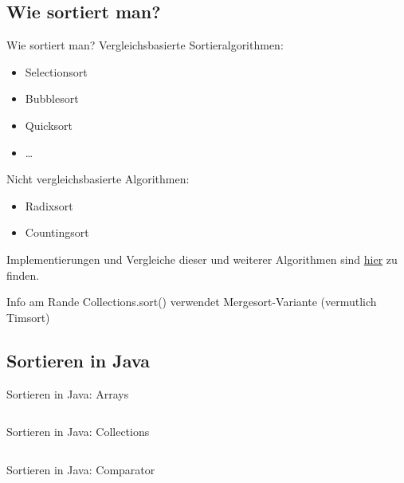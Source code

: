 \documentclass[usepdftitle=false,hyperref={pdfpagelabels=false}]{beamer}
\begin{document}
\subsection{Wie sortiert man?}
\begin{frame}{Wie sortiert man?}
    Vergleichsbasierte Sortieralgorithmen:
    \begin{itemize}
        \item Selectionsort
        \item Bubblesort
        \item Quicksort
        \item \dots
    \end{itemize}

    Nicht vergleichsbasierte Algorithmen:
    \begin{itemize}
        \item Radixsort
        \item Countingsort
    \end{itemize}

    Implementierungen und Vergleiche dieser und weiterer Algorithmen sind
    \href{http://martin-thoma.com/ubersicht-uber-sortieralgorithmen/}{hier}
    zu finden.

    \begin{block}{Info am Rande}
        Collections.sort() verwendet Mergesort-Variante (vermutlich Timsort)
    \end{block}
\end{frame}

\subsection{Sortieren in Java}
\begin{frame}{Sortieren in Java: Arrays}
    \inputminted[linenos=true, numbersep=5pt, tabsize=4, fontsize=\small]{java}{Main-Arrays-sort.java}
\end{frame}

\begin{frame}{Sortieren in Java: Collections}
    \inputminted[linenos=true, numbersep=5pt, tabsize=4, fontsize=\small]{java}{Main-Collection-sort.java}
\end{frame}

\begin{frame}{Sortieren in Java: Comparator}
    \inputminted[linenos=true, numbersep=5pt, tabsize=4, fontsize=\small]{java}{PopulationDensityComperator.java}
\end{frame}
\end{document}
